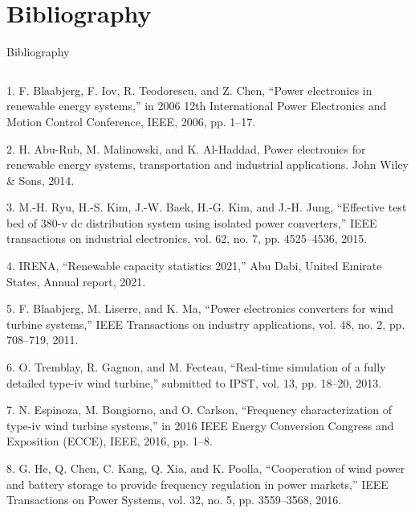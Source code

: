 \section{Bibliography}
\begin{frame}{Bibliography}
  \tiny
  \justifying
\begin{columns}
\begin{column}{0.5\textwidth}
  \parbox{1\textwidth}{
  1. F. Blaabjerg, F. Iov, R. Teodorescu, and Z. Chen, “Power electronics in renewable energy systems,” in 2006 12th International Power Electronics and Motion Control Conference, IEEE, 2006, pp. 1–17.
\vspace{0.1cm}

  2. H. Abu-Rub, M. Malinowski, and K. Al-Haddad, Power electronics for renewable energy systems, transportation and industrial applications. John Wiley \& Sons, 2014. 
\vspace{0.1cm}

  3. M.-H. Ryu, H.-S. Kim, J.-W. Baek, H.-G. Kim, and J.-H. Jung, “Effective test bed of 380-v dc distribution system using isolated power converters,” IEEE transactions on industrial electronics, vol. 62, no. 7, pp. 4525–4536, 2015.
  \vspace{0.1cm}

  4. IRENA, “Renewable capacity statistics 2021,” Abu Dabi, United Emirate States, Annual report, 2021.
  \vspace{0.1cm}

  5. F. Blaabjerg, M. Liserre, and K. Ma, “Power electronics converters for wind turbine systems,” IEEE Transactions on industry applications, vol. 48, no. 2, pp. 708–719, 2011.
  \vspace{0.1cm}

  6. O. Tremblay, R. Gagnon, and M. Fecteau, “Real-time simulation of a fully detailed type-iv wind turbine,” submitted to IPST, vol. 13, pp. 18–20, 2013.
  \vspace{0.1cm}

  7. N. Espinoza, M. Bongiorno, and O. Carlson, “Frequency characterization of type-iv wind turbine systems,” in 2016 IEEE Energy Conversion Congress and Exposition (ECCE), IEEE, 2016, pp. 1–8.
  \vspace{0.1cm}

  8. G. He, Q. Chen, C. Kang, Q. Xia, and K. Poolla, “Cooperation of wind power and battery storage to provide frequency regulation in power markets,” IEEE Transactions on Power Systems, vol. 32, no. 5, pp. 3559–3568, 2016.
  \vspace{0.1cm}

}
\end{column}
\end{columns}
\end{frame}
